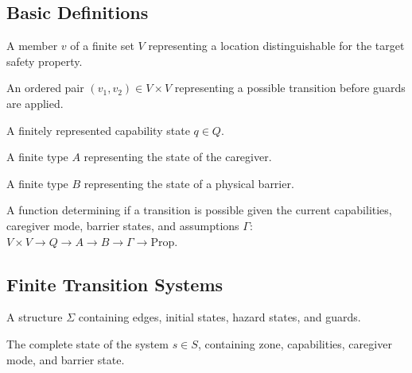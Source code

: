 \subsection{Basic Definitions}

\begin{definition}
A member $v$ of a finite set $V$ representing a location distinguishable for the target safety property.
\end{definition}

\begin{definition}
An ordered pair $(v_1, v_2) \in V \times V$ representing a possible transition before guards are applied.
\end{definition}

\begin{definition}
A finitely represented capability state $q \in Q$.
\end{definition}

\begin{definition}
A finite type $A$ representing the state of the caregiver.
\end{definition}

\begin{definition}
A finite type $B$ representing the state of a physical barrier.
\end{definition}

\begin{definition}
A function determining if a transition is possible given the current capabilities, caregiver mode, barrier states, and assumptions $\Gamma$: $V \times V \to Q \to A \to B \to \Gamma \to \text{Prop}$.
\end{definition}

\subsection{Finite Transition Systems}

\begin{definition}
A structure $\Sigma$ containing edges, initial states, hazard states, and guards.
\end{definition}

\begin{definition}
The complete state of the system $s \in S$, containing zone, capabilities, caregiver mode, and barrier state.
\end{definition}

